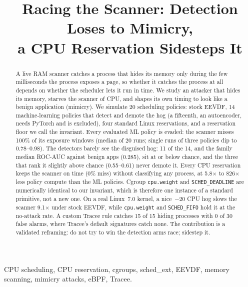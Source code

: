 \documentclass[conference]{IEEEtran}
\begin{document}
\title{Racing the Scanner: Detection Loses to Mimicry,\\a CPU Reservation Sidesteps It}

\author{
}

\maketitle

\begin{abstract}
A live RAM scanner catches a process that hides its memory only during the few
milliseconds the process exposes a page, so whether it catches the process at
all depends on whether the scheduler lets it run in time. We study an attacker
that hides its memory, starves the scanner of CPU, and shapes its own timing to
look like a benign application (mimicry). We simulate 20 scheduling policies:
stock EEVDF, 14 machine-learning policies that detect and demote the hog (a
fifteenth, an autoencoder, needs PyTorch and is excluded), four standard Linux
reservations, and a reservation floor we call the invariant. Every evaluated ML
policy is evaded: the scanner misses 100\% of its exposure windows (median of
20 runs; single runs of three policies dip to 0.78--0.98). The detectors barely
see the disguised hog: 11 of the 14, and the family median ROC-AUC against
benign apps (0.285), sit at or below chance, and the three that rank it slightly
above chance (0.55--0.61) never demote it. Every CPU reservation keeps the
scanner on time (0\% miss) without classifying any process, at 5.8$\times$ to
826$\times$ less policy compute than the ML policies. Cgroup \texttt{cpu.weight}
and \texttt{SCHED\_DEADLINE} are numerically identical to our invariant, which
is therefore one instance of a standard primitive, not a new one. On a real
Linux~7.0 kernel, a nice~$-20$ CPU hog slows the scanner 9.1$\times$ under stock
EEVDF, while \texttt{cpu.weight} and \texttt{SCHED\_FIFO} hold it at the
no-attack rate. A custom Tracee rule catches 15 of 15 hiding processes with 0 of
30 false alarms, where Tracee's default signatures catch none. The contribution
is a validated reframing: do not try to win the detection arms race; sidestep it.
\end{abstract}

\begin{IEEEkeywords}
CPU scheduling, CPU reservation, cgroups, sched\_ext, EEVDF, memory scanning,
mimicry attacks, eBPF, Tracee.
\end{IEEEkeywords}
\end{document}
